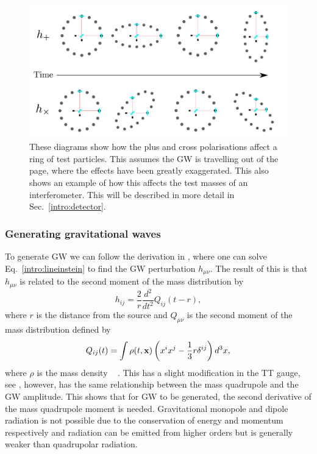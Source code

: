 \begin{figure}[h]
    \centering
    \includegraphics[width=\textwidth]{C1_intro/polarisation_ring.pdf}
 \caption[Plus and Cross polarisations]{These diagrams show how the plus and cross
polarisations affect a ring of test particles. This assumes
the \gls{GW} is travelling out of the page, where the effects
have been greatly exaggerated. This also shows an example of how this
affects the test masses of an interferometer. This will be
described in more detail in Sec.~\ref{intro:detector}.}
\label{gw:polarisations}
\end{figure}



\subsubsection{Generating gravitational waves}

To generate \gls{GW} we can follow the derivation in \citep{flanagan2005BasicsGravitational}, where one can solve Eq.~\ref{intro:lineinstein} to find the \gls{GW} perturbation $h_{\mu \nu}$.
The result of this is that $h_{\mu \nu}$ is related to the second moment of the mass distribution by
\begin{equation}
    \label{intro:gravwave:amp}
        h_{ij} = \frac{2}{r}  \frac{d^2}{dt^2} Q_{ij}(t-r),
\end{equation}
where $r$ is the distance from the source \citep{letiec2016TheoryGravitational} and $Q_{\mu \nu}$ is the second moment of the mass distribution defined by 
\begin{equation}
    Q_{ij}(t) = \int \rho(t,{\bf x}) \left ( x^i x^j - \frac{1}{3} r \delta^{ij} \right)d^3x,
\end{equation}
where $\rho$ is the mass density ~\citep{flanagan2005BasicsGravitational} .  
This has a slight modification in the TT gauge, see
\citep{flanagan2005BasicsGravitational}, however, has the same relationship
between the mass quadrupole and the \gls{GW} amplitude.  This shows that for
\gls{GW} to be generated, the second derivative of the mass quadrupole moment
is needed. 
Gravitational monopole and dipole radiation is not possible due to the conservation of energy and momentum respectively \citep{misner1973Gravitation} and radiation can be emitted from higher orders but is generally weaker than quadrupolar radiation. 

